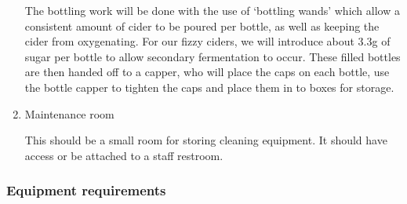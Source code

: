\documentclass[11pt]{article}
\begin{document}
\begin{enumerate}
The bottling work will be done with the use of `bottling wands' which allow a
consistent amount of cider to be poured per bottle, as well as keeping the cider
from oxygenating. For our fizzy ciders, we will introduce about 3.3g of sugar
per bottle to allow secondary fermentation to occur. These filled bottles are
then handed off to a capper, who will place the caps on each bottle, use the
bottle capper to tighten the caps and place them in to boxes for storage.

  \item Maintenance room

This should be a small room for storing cleaning equipment. It should have
access or be attached to a staff restroom.
  \end{enumerate}

    \subsubsection{Equipment requirements}
\end{document}

